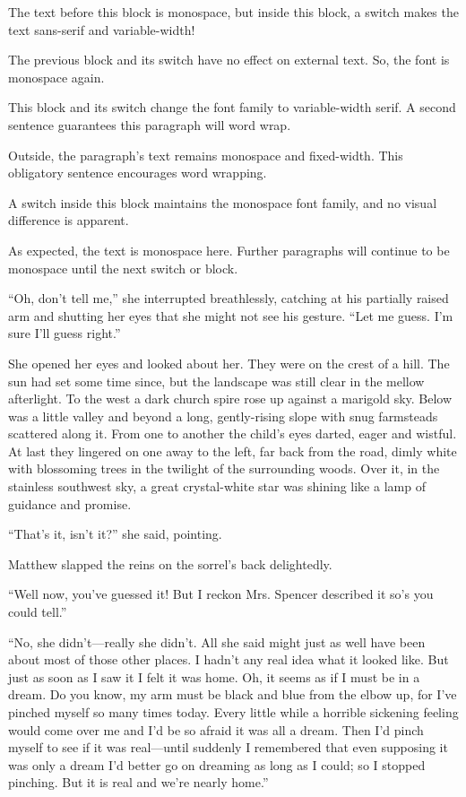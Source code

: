 \documentclass[a4paper]{article}
\begin{document}
{\sffamily The text before this block is monospace, but inside this block, a switch makes the text sans-serif and variable-width!}

The previous block and its switch have no effect on external text. So, the font is monospace again.

{\rmfamily This block and its switch change the font family to variable-width serif. A second sentence guarantees this paragraph will word wrap.}

Outside, the paragraph's text remains monospace and fixed-width. This obligatory sentence encourages word wrapping.

{\ttfamily A switch inside this block maintains the monospace font family, and no visual difference is apparent.}

As expected, the text is monospace here. Further paragraphs will continue to be monospace until the next switch or block.

{\sffamily``Oh, don't tell me,'' she interrupted breathlessly, catching at his partially raised arm and shutting her eyes that she might not see his gesture. ``Let me guess. I'm sure I'll guess right.''

She opened her eyes and looked about her. They were on the crest of a hill. The sun had set some time since, but the landscape was still clear in the mellow afterlight. To the west a dark church spire rose up against a marigold sky. Below was a little valley and beyond a long, gently-rising slope with snug farmsteads scattered along it. From one to another the child's eyes darted, eager and wistful. At last they lingered on one away to the left, far back from the road, dimly white with blossoming trees in the twilight of the surrounding woods. Over it, in the stainless southwest sky, a great crystal-white star was shining like a lamp of guidance and promise.}

``That's it, isn't it?'' she said, pointing.

Matthew slapped the reins on the sorrel's back delightedly.

{\ttfamily``Well now, you've guessed it! But I reckon Mrs. Spencer described it so's you could tell.''

``No, she didn't---really she didn't. All she said might just as well have been about most of those other places. I hadn't any real idea what it looked like. But just as soon as I saw it I felt it was home. Oh, it seems as if I must be in a dream. Do you know, my arm must be black and blue from the elbow up, for I've pinched myself so many times today. Every little while a horrible sickening feeling would come over me and I'd be so afraid it was all a dream. Then I'd pinch myself to see if it was real---until suddenly I remembered that even supposing it was only a dream I'd better go on dreaming as long as I could; so I stopped pinching. But it is real and we're nearly home.''}
\end{document}
